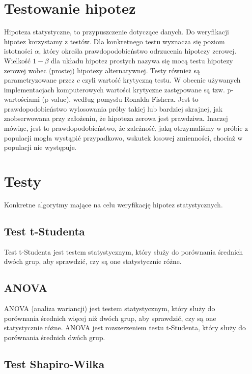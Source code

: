 \documentclass{../notatki}
\begin{document}
\section{Testowanie hipotez}

Hipoteza statystyczne, to przypuszczenie dotyczące danych. Do weryfikacji
hipotez korzystamy z testów. Dla konkretnego testu wyznacza się poziom
istotności $\alpha$, który określa prawdopodobieństwo odrzucenia hipotezy
zerowej. Wielkość $1-\beta$ dla układu hipotez prostych nazywa się mocą testu
hipotezy zerowej wobec (prostej) hipotezy alternatywnej. Testy również są
parametryzowane przez $c$ czyli wartość krytyczną testu. W obecnie używanych
implementacjach komputerowych wartości krytyczne zastępowane są tzw.
p-wartościami (p-value), według pomysłu Ronalda Fishera. Jest to
prawdopodobieństwo wylosowania próby takiej lub bardziej skrajnej, jak
zaobserwowana przy założeniu, że hipoteza zerowa jest prawdziwa. Inaczej mówiąc,
jest to prawdopodobieństwo, że zależność, jaką otrzymaliśmy w próbie z populacji
mogła wystąpić przypadkowo, wskutek losowej zmienności, chociaż w populacji nie
występuje.

\section{Testy}

Konkretne algorytmy mające na celu weryfikację hipotez statystycznych.

\subsection{Test t-Studenta}

Test t-Studenta jest testem statystycznym, który służy do porównania
średnich dwóch grup, aby sprawdzić, czy są one statystycznie
różne.

\subsection{ANOVA}

ANOVA (analiza wariancji) jest testem statystycznym, który służy do
porównania średnich więcej niż dwóch grup, aby sprawdzić, czy są one
statystycznie różne. ANOVA jest rozszerzeniem testu t-Studenta, który
służy do porównania średnich dwóch grup.

\subsection{Test Shapiro-Wilka}
\end{document}
